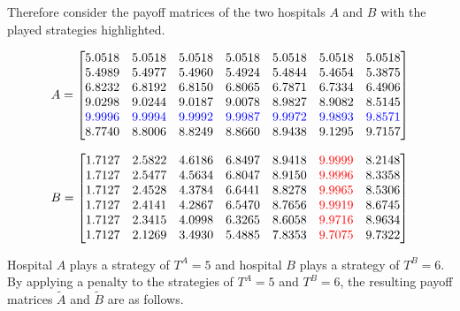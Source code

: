 Therefore consider the payoff matrices of the two hospitals \(A\) and \(B\)
with the played strategies highlighted.


\begin{equation*}
    A = 
    \begin{bmatrix}
        5.0518 & 5.0518 & 5.0518 & 5.0518 & 5.0518 &
        5.0518 & 5.0518 \\
        5.4989 & 5.4977 & 5.4960 & 5.4924 & 5.4844 &
        5.4654 & 5.3875 \\
        6.8232  & 6.8192 & 6.8150 & 6.8065 & 6.7871  &
        6.7334 & 6.4906 \\
        9.0298 & 9.0244 & 9.0187 & 9.0078 & 8.9827 &
        8.9082 & 8.5145 \\
        \color{blue}{9.9996} & \color{blue}{9.9994} & \color{blue}{9.9992} & 
        \color{blue}{9.9987} & \color{blue}{9.9972} & \color{blue}{9.9893} & 
        \color{blue}{9.8571} \\
        8.7740 & 8.8006 & 8.8249 & 8.8660 & 8.9438 &
        9.1295 & 9.7157
    \end{bmatrix}
\end{equation*}

\begin{equation*}
    B = 
    \begin{bmatrix}
        1.7127 & 2.5822 & 4.6186 & 6.8497 & 8.9418 &
        \color{red}{9.9999} & 8.2148 \\
        1.7127 & 2.5477 & 4.5634 & 6.8047 & 8.9150  &
        \color{red}{9.9996} & 8.3358 \\
        1.7127 & 2.4528    & 4.3784 & 6.6441 & 8.8278 &
        \color{red}{9.9965} & 8.5306 \\
        1.7127 & 2.4141 & 4.2867 & 6.5470 & 8.7656 &
        \color{red}{9.9919} & 8.6745 \\
        1.7127 & 2.3415 & 4.0998 & 6.3265 & 8.6058 &
        \color{red}{9.9716} & 8.9634 \\
        1.7127 & 2.1269 & 3.4930 & 5.4885 & 7.8353 &
        \color{red}{9.7075} & 9.7322 \\
    \end{bmatrix}
\end{equation*}

Hospital \(A\) plays a strategy of \(T^A = 5\) and hospital \(B\) plays a
strategy of \(T^B = 6\).
By applying a penalty to the strategies of \(T^A = 5\) and \(T^B = 6\), the
resulting payoff matrices \(\tilde{A}\) and \(\tilde{B}\) are as follows.

